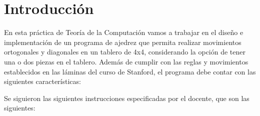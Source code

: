 \chapter{Introducción}
En esta práctica de Teoría de la Computación vamos a trabajar en el diseño e implementación de un programa de ajedrez que permita realizar movimientos ortogonales y diagonales en un tablero de 4x4, considerando la opción de tener una o dos piezas en el tablero. Además de cumplir con las reglas y movimientos establecidos en las láminas del curso de Stanford, el programa debe contar con las siguientes características:\newline

Se siguieron las siguientes instrucciones especificadas por el docente, que son las siguientes:\newline
\newline
